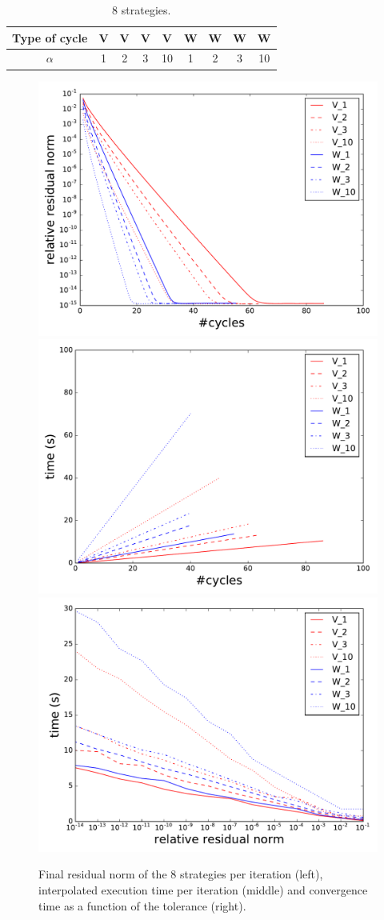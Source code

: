 \begin{table}

\begin{center}
 \begin{tabular}{|c|c|c|c|c|c|c|c|c|}
   \hline
   Type of cycle & V & V & V & V & W & W & W & W \\
   \hline
   $\alpha$ & 1 & 2 & 3 & 10 & 1 & 2 & 3 & 10 \\
   \hline
 \end{tabular}
\end{center}
 \caption{8 strategies.}
 \label{table.strat1}

\end{table}


\begin{figure}
  \includegraphics[width=0.33\linewidth]{figs/convergence_1_norm.pdf}
  \includegraphics[width=0.33\linewidth]{figs/convergence_1_time.pdf}
  \includegraphics[width=0.33\linewidth]{figs/time_convergence.pdf}
  \caption{Final residual norm of the 8 strategies per iteration (left), interpolated execution time per iteration (middle) and convergence time as a function of the tolerance (right).}
  \label{fig.first_tests}
\end{figure}


